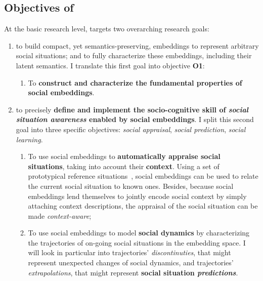 \subsection{Objectives of \project}
\label{sec:objectives}


\begin{rewrite}

\noindent At the basic research level, \project targets two overarching research goals:

\begin{enumerate}[label=\textbf{(\arabic*)}]
    \item to build compact, yet semantics-preserving, embeddings to represent
arbitrary social situations; and to fully characterize these embeddings,
including their latent semantics. I translate this first goal into objective
{\bf O1}:

\begin{enumerate}[label=\textbf{O\arabic*}]
    \item \label{O1} To \textbf{construct and characterize the fundamental
properties of social embeddings}.
\end{enumerate}

    \item to precisely \textbf{define and implement the socio-cognitive skill of
        \emph{social situation awareness} enabled by social embeddings}. I split this
        second goal into three specific objectives: \emph{social appraisal},
        \emph{social prediction}, \emph{social learning}.

\begin{enumerate}[label=\textbf{O2.\arabic*}]
    \item \label{O2.1} To use social embeddings to \textbf{automatically appraise
        social situations}, taking into account their \textbf{context}. Using
        a set of prototypical reference situations~\cite{kelley2003atlas}, social embeddings
        can be used to relate the current social situation to known ones.
        Besides, because social embeddings lend themselves to jointly encode
        social context by simply attaching context descriptions, the appraisal
        of the social situation can be made \emph{context-aware};

    \item \label{O2.2} To use social embeddings to model \textbf{social
        dynamics} by characterizing the trajectories of on-going social situations in the
        embedding space. I will look in particular into trajectories'
        \emph{discontinuties}, that might represent unexpected changes of social
        dynamics, and trajectories' \emph{extrapolations}, that might represent
        \textbf{social situation \emph{predictions}}.


\end{enumerate}
\end{enumerate}
\end{rewrite}

